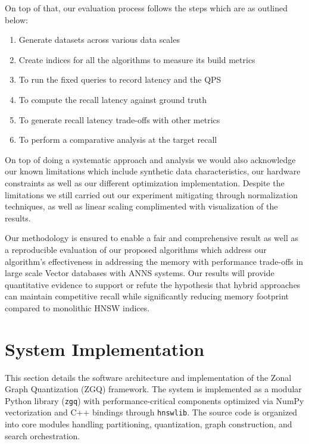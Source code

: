 \documentclass[conference]{IEEEtran}
\begin{document}
On top of that, our evaluation process follows the steps which are as outlined below:
\begin{enumerate}
    \item Generate datasets across various data scales
    \item Create indices for all the algorithms to measure its build metrics
    \item To run the fixed queries to record latency and the QPS
    \item To compute the recall latency against ground truth
    \item To generate recall latency trade-offs with other metrics
    \item To perform a comparative analysis at the target recall
\end{enumerate}

On top of doing a systematic approach and analysis we would also acknowledge our known limitations which include synthetic data characteristics, our hardware constraints as well as our different optimization implementation. Despite the limitations we still carried out our experiment mitigating through normalization techniques, as well as linear scaling complimented with visualization of the results.

Our methodology is ensured to enable a fair and comprehensive result as well as a reproducible evaluation of our proposed algorithms which address our algorithm’s effectiveness in addressing the memory with performance trade-offs in large scale Vector databases with ANNS systems. Our results will provide quantitative evidence to support or refute the hypothesis that hybrid approaches can maintain competitive recall while significantly reducing memory footprint compared to monolithic HNSW indices.

\section{System Implementation}

This section details the software architecture and implementation of the Zonal Graph Quantization (ZGQ) framework. The system is implemented as a modular Python library (\texttt{zgq}) with performance-critical components optimized via NumPy vectorization and C++ bindings through \texttt{hnswlib}. The source code is organized into core modules handling partitioning, quantization, graph construction, and search orchestration.
\end{document}
